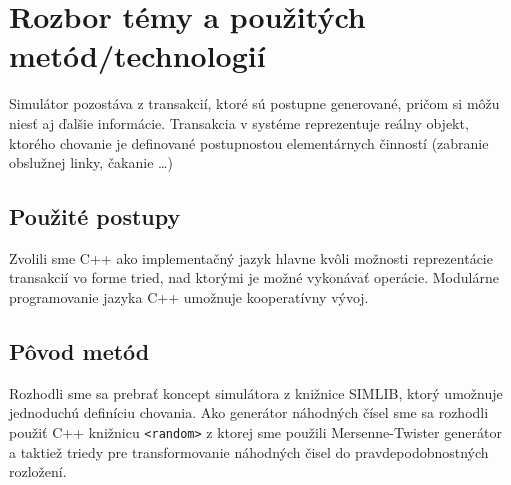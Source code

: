 \documentclass[11pt, a4paper, titlepage]{article}
\begin{document}
\section{Rozbor témy a použitých metód/technologií}
Simulátor pozostáva z transakcií, ktoré sú postupne generované\cite[str.~42]{opora}, pričom si môžu niesť aj ďalšie informácie\cite[str.~43]{opora}. Transakcia v systéme reprezentuje reálny objekt, ktorého chovanie je definované postupnostou elementárnych činností (zabranie obslužnej linky, čakanie \ldots)

\subsection{Použité postupy}
Zvolili sme C++ ako implementačný jazyk hlavne kvôli možnosti reprezentácie transakcií vo forme tried, nad ktorými je možné vykonávať operácie. Modulárne programovanie jazyka C++ umožnuje kooperatívny vývoj.

\subsection{Pôvod metód}
Rozhodli sme sa prebrať koncept simulátora z knižnice SIMLIB, ktorý umožnuje jednoduchú definíciu chovania. Ako generátor náhodných čísel sme sa rozhodli použiť C++ knižnicu \texttt{<random>} z ktorej sme použili Mersenne-Twister\cite[str.~20]{opora} generátor a taktiež triedy pre transformovanie náhodných čisel do pravdepodobnostných rozložení.

%
%
\end{document}
